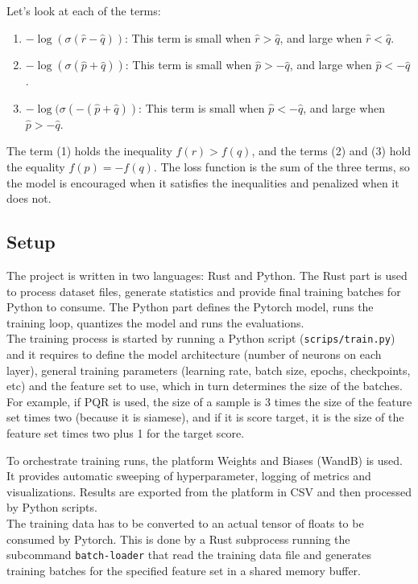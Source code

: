 Let's look at each of the terms:

\begin{enumerate}
\itemsep0em
\item $-\log(\sigma(\hat{r} - \hat{q}))$: This term is small when $\hat{r} > \hat{q}$, and large when $\hat{r} < \hat{q}$.
\item $-\log(\sigma(\hat{p} + \hat{q}))$: This term is small when $\hat{p} > -\hat{q}$, and large when $\hat{p} < -\hat{q}$.
\item $-\log(\sigma(-(\hat{p} + \hat{q}))$: This term is small when $\hat{p} < -\hat{q}$, and large when $\hat{p} > -\hat{q}$.
\end{enumerate}

The term (1) holds the inequality $f(r) > f(q)$, and the terms (2) and (3) hold the equality $f(p) = -f(q)$. The loss function is the sum of the three terms, so the model is encouraged when it satisfies the inequalities and penalized when it does not.

\subsection{Setup}


The project is written in two languages: Rust and Python. The Rust part is used to process dataset files, generate statistics and provide final training batches for Python to consume. The Python part defines the Pytorch model, runs the training loop, quantizes the model and runs the evaluations. \\

The training process is started by running a Python script (\texttt{scrips/train.py}) and it requires to define the model architecture (number of neurons on each layer), general training parameters (learning rate, batch size, epochs, checkpoints, etc) and the feature set to use, which in turn determines the size of the batches. For example, if PQR is used, the size of a sample is 3 times the size of the feature set times two (because it is siamese), and if it is score target, it is the size of the feature set times two plus 1 for the target score.

To orchestrate training runs, the platform Weights and Biases (WandB) is used. It provides automatic sweeping of hyperparameter, logging of metrics and visualizations. Results are exported from the platform in CSV and then processed by Python scripts. \\

The training data has to be converted to an actual tensor of floats to be consumed by Pytorch. This is done by a Rust subprocess running the subcommand \texttt{batch-loader} that read the training data file and generates training batches for the specified feature set in a shared memory buffer.

